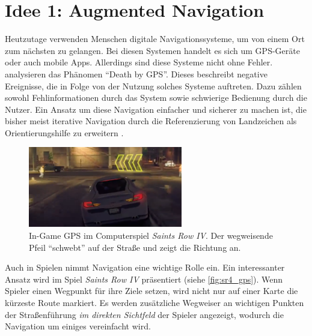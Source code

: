 \documentclass[a4paper]{scrartcl}
\begin{document}
\section*{Idee 1: Augmented Navigation}

Heutzutage verwenden Menschen digitale Navigationssysteme, um von einem Ort zum nächsten zu gelangen.
Bei diesen Systemen handelt es sich um GPS-Geräte oder auch mobile Apps.
Allerdings sind diese Systeme nicht ohne Fehler.
\textcite{Lin2017} analysieren das Phänomen \enquote{Death by GPS}.
Dieses beschreibt negative Ereignisse, die in Folge von der Nutzung solches Systeme auftreten.
Dazu zählen sowohl Fehlinformationen durch das System sowie schwierige Bedienung durch die Nutzer.
Ein Ansatz um diese Navigation einfacher und sicherer zu machen ist, die bisher meist iterative Navigation durch die Referenzierung von Landzeichen als Orientierungshilfe zu erweitern \parencites{Fingas2018}{Wenig2017}.

\begin{figure}[h]
	\centering
	\includegraphics[width=0.6\textwidth]{figures/SR4GPS.png}
	\caption{In-Game GPS im Computerspiel \emph{Saints Row IV}. Der wegweisende Pfeil \enquote{schwebt} auf der Straße und zeigt die Richtung an.}
	\label{fig:sr4_gps}
\end{figure}

Auch in Spielen nimmt Navigation eine wichtige Rolle ein.
Ein interessanter Ansatz wird im Spiel \emph{Saints Row IV} präsentiert (siehe \autoref{fig:sr4_gps}).
Wenn Spieler einen Wegpunkt für ihre Ziele setzen, wird nicht nur auf einer Karte die kürzeste Route markiert.
Es werden zusätzliche Wegweiser an wichtigen Punkten der Straßenführung \emph{im direkten Sichtfeld} der Spieler angezeigt, wodurch die Navigation um einiges vereinfacht wird.
\end{document}
